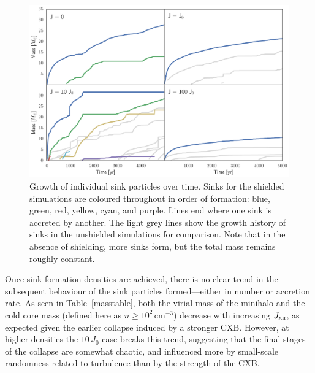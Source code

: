 \documentclass{thesis}
\newcommand{\cc}{\ensuremath{\,\mathrm{cm}^{-3}}\xspace}
\newcommand{\jxr}{\ensuremath{J_{\textsc{xr}}}\xspace}
\newcommand{\RefTab}[1]{\mbox{Table~\ref{#1}}}
\begin{document}
\begin{figure}
  \begin{center}
    \includegraphics[width=\columnwidth]{figures/sinks/sink_masses}
    \caption{Growth of individual sink particles over time. Sinks for the shielded simulations are coloured throughout in order of formation: blue, green, red, yellow,  cyan, and purple. Lines end where one sink is accreted by another.  The light grey lines show the growth history of sinks in the unshielded simulations for comparison. Note that in the absence of shielding, more sinks form, but the total mass remains roughly constant.}
    \label{sinkmasses}
  \end{center}
\end{figure}

 Once sink formation densities are achieved, there is no clear trend in the subsequent behaviour of the sink particles formed---either in number or accretion rate.  As seen in \RefTab{masstable}, both the virial mass of the minihalo and the cold core mass (defined here as $n\geq10^2\cc$) decrease with increasing \jxr, as expected given the earlier collapse induced by a stronger CXB.  However, at higher densities the $10\,J_0$ case breaks this trend, suggesting that the final stages of the collapse are somewhat chaotic, and influenced more by small-scale randomness related to turbulence than by the strength of the CXB.
\end{document}
